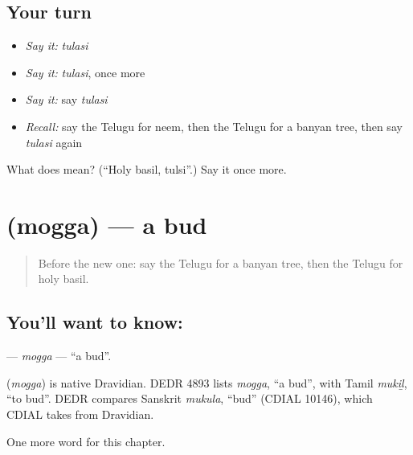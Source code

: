 \subsection*{Your turn}
\begin{itemize}
\raggedright
  \item \emph{Say it:} \emph{tulasi}
  \item \emph{Say it:} \emph{tulasi}, once more
  \item \emph{Say it:} say \emph{tulasi}
  \item \emph{Recall:} say the Telugu for neem, then the Telugu for a banyan tree, then say \emph{tulasi} again
\end{itemize}

\begin{tcolorbox}[breakable,colback=teal!4,colframe=teal!35!black,title={Before you move on}]
What does  mean? (\textquotedblleft{}Holy basil, tulsi\textquotedblright{}.) Say it once more.
\end{tcolorbox}
\section[\texorpdfstring{\te{మొగ్గ} (mogga)}{మొగ్గ (mogga)}]{ (mogga) — a bud}

\label{lesson:TE-C266-mogga}



\begin{quote}
Before the new one: say the Telugu for a banyan tree, then the Telugu for holy basil.
\end{quote}

\subsection*{You'll want to know: }
\textbf{} — \emph{mogga} — \textquotedblleft{}a bud\textquotedblright{}.

\begin{cousinweb}
\textbf{} (\emph{mogga}) is native Dravidian. DEDR 4893 lists \emph{mogga}, \textquotedblleft{}a bud\textquotedblright{}, with Tamil \emph{mukiḻ}, \textquotedblleft{}to bud\textquotedblright{}. DEDR compares Sanskrit \emph{mukula}, \textquotedblleft{}bud\textquotedblright{} (CDIAL 10146), which CDIAL takes from Dravidian.
\end{cousinweb}

\begin{grammarlens}[title={What you've built}]
One more word for this chapter.
\end{grammarlens}

